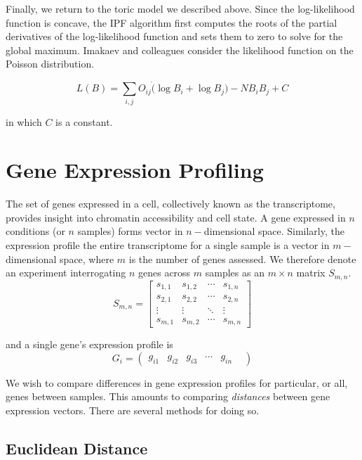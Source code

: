 Finally, we return to the \gls{toric} model we described above.  Since the log-likelihood function is concave, the \gls{IPF} algorithm first
computes the roots of the partial derivatives of the log-likelihood function and sets them to zero to solve for the global maximum.  Imakaev
and colleagues consider the likelihood function on the Poisson distribution.

\[
  L(B) = \sum_{i,j}O_{ij} \dot (\log{B_i} + \log{B_j}) - NB_{i}B_{j} + C
\]

in which $C$ is a constant.


\section*{Gene Expression Profiling}

The set of genes expressed in a cell, collectively known as the \gls{transcriptome}, provides insight into chromatin accessibility
and cell state.  A gene expressed in $n$ conditions (or $n$ samples) forms vector in $n-$dimensional space.  Similarly, the expression
profile the entire transcriptome for a single sample is a vector in $m-$dimensional space, where $m$ is the number of genes assessed.
We therefore denote an experiment interrogating $n$ genes across $m$ samples as an $m \times n$ matrix $S_{m,n}$.
\[
  S_{m,n} = \left[
    \begin{array}{cccc}
      s_{1,1} & s_{1,2} & \cdots & s_{1,n} \\
      s_{2,1} & s_{2,2} & \cdots & s_{2,n} \\
      \vdots & \vdots & \ddots  & \vdots \\
      s_{m,1} & s_{m,2} & \cdots & s_{m,n}
    \end{array}
  \right]
\]

and a single gene's expression profile is
\[ G_{i} = \begin{pmatrix} g_{i1} & g_{i2} & g_{i3} & \cdots & g_{in} & \end{pmatrix} \]

We wish to compare differences in gene expression profiles for particular, or all, genes between samples.  This amounts to comparing
\textit{distances} between gene expression vectors.  There are several methods for doing so.

\subsection*{Euclidean Distance}

